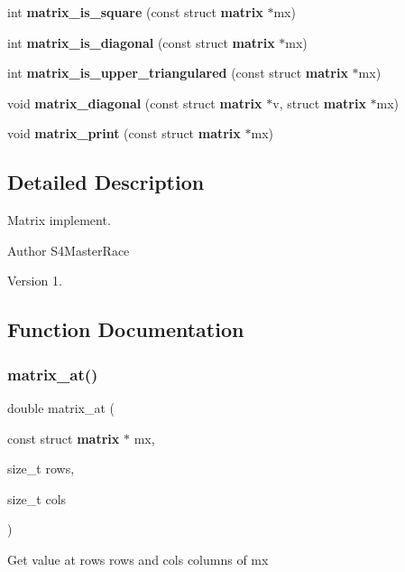 \begin{DoxyCompactItemize}
\item 
int \textbf{ matrix\+\_\+is\+\_\+square} (const struct \textbf{ matrix} $\ast$mx)
\item 
int \textbf{ matrix\+\_\+is\+\_\+diagonal} (const struct \textbf{ matrix} $\ast$mx)
\item 
int \textbf{ matrix\+\_\+is\+\_\+upper\+\_\+triangulared} (const struct \textbf{ matrix} $\ast$mx)
\item 
void \textbf{ matrix\+\_\+diagonal} (const struct \textbf{ matrix} $\ast$v, struct \textbf{ matrix} $\ast$mx)
\item 
void \textbf{ matrix\+\_\+print} (const struct \textbf{ matrix} $\ast$mx)
\end{DoxyCompactItemize}


\subsection{Detailed Description}
Matrix implement. 

\begin{DoxyAuthor}{Author}
S4\+Master\+Race 
\end{DoxyAuthor}
\begin{DoxyVersion}{Version}
1. 
\end{DoxyVersion}


\subsection{Function Documentation}
\mbox{\label{matrix_8c_ace105cd24473b52d67874132e81dd55b}} 
\subsubsection{matrix\+\_\+at()}
{\footnotesize\ttfamily double matrix\+\_\+at (\begin{DoxyParamCaption}\item[{const struct \textbf{ matrix} $\ast$}]{mx,  }\item[{size\+\_\+t}]{rows,  }\item[{size\+\_\+t}]{cols }\end{DoxyParamCaption})\hspace{0.3cm}{\ttfamily [inline]}}

Get value at {\ttfamily rows} rows and {\ttfamily cols} columns of {\ttfamily mx}


